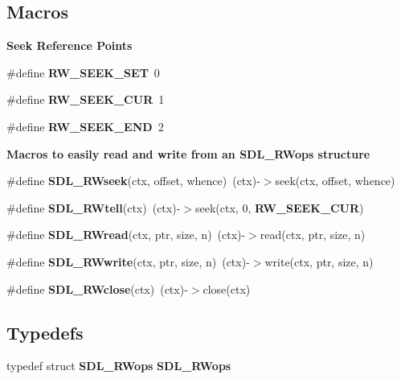 \subsection*{Macros}
\begin{Indent}{\bf Seek Reference Points}\par
\begin{DoxyCompactItemize}
\item 
\#define {\bf R\+W\+\_\+\+S\+E\+E\+K\+\_\+\+S\+E\+T}~0
\item 
\#define {\bf R\+W\+\_\+\+S\+E\+E\+K\+\_\+\+C\+U\+R}~1
\item 
\#define {\bf R\+W\+\_\+\+S\+E\+E\+K\+\_\+\+E\+N\+D}~2
\end{DoxyCompactItemize}
\end{Indent}
\begin{Indent}{\bf Macros to easily read and write from an S\+D\+L\+\_\+\+R\+Wops structure}\par
\begin{DoxyCompactItemize}
\item 
\#define {\bfseries S\+D\+L\+\_\+\+R\+Wseek}(ctx,  offset,  whence)~(ctx)-\/$>$seek(ctx, offset, whence)\label{_s_d_l__rwops_8h_a21053fbfbd96536cb7b9404a12f66822}

\item 
\#define {\bfseries S\+D\+L\+\_\+\+R\+Wtell}(ctx)~(ctx)-\/$>$seek(ctx, 0, {\bf R\+W\+\_\+\+S\+E\+E\+K\+\_\+\+C\+U\+R})\label{_s_d_l__rwops_8h_abda2d76d76788e378d4d27344eb71d43}

\item 
\#define {\bfseries S\+D\+L\+\_\+\+R\+Wread}(ctx,  ptr,  size,  n)~(ctx)-\/$>$read(ctx, ptr, size, n)\label{_s_d_l__rwops_8h_a49822992c9b056f6cf6cfc52c9a13050}

\item 
\#define {\bfseries S\+D\+L\+\_\+\+R\+Wwrite}(ctx,  ptr,  size,  n)~(ctx)-\/$>$write(ctx, ptr, size, n)\label{_s_d_l__rwops_8h_a83549e70a4a09a1d10c7a1b14b5cbdf4}

\item 
\#define {\bfseries S\+D\+L\+\_\+\+R\+Wclose}(ctx)~(ctx)-\/$>$close(ctx)\label{_s_d_l__rwops_8h_a02700bab029c9438c0102457822c1231}

\end{DoxyCompactItemize}
\end{Indent}
\subsection*{Typedefs}
\begin{DoxyCompactItemize}
\item 
typedef struct {\bf S\+D\+L\+\_\+\+R\+Wops} {\bf S\+D\+L\+\_\+\+R\+Wops}
\end{DoxyCompactItemize}
